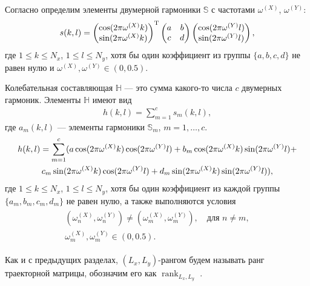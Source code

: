 \documentclass[specialist,
               substylefile = spbu.rtx,
               subf,href,colorlinks=true, 12pt]{disser}
\def\rank{\mathop{\mathrm{rank}}}
\begin{document}
Согласно \cite{Golyandina.Usevich2010} определим элементы двумерной гармоники $\mathbb{S}$ с частотами $\omega^{(X)}$, $\omega^{(Y)}$:
\begin{gather} \label{eq:2d_cos_el}
\notag
s(k,l) =  \left(
\begin{matrix}
\cos(2\pi \omega^{(X)}k) \\ \notag
\sin(2\pi \omega^{(X)}k)
\end{matrix}
\right)^{\mathrm{T}}
 \left(
\begin{matrix}
a & b \\
c & d
\end{matrix}
\right)
 \left(
\begin{matrix}
\cos(2\pi \omega^{(Y)}l) \\ \notag
\sin(2\pi \omega^{(Y)}l)
\end{matrix}
\right),
\notag
\end{gather}
где $1 \leqslant k \leqslant N_x$, $1 \leqslant l \leqslant N_y$, хотя бы один коэффициент из  группы $\{a,b,c,d\}$ не равен нулю и
$\omega^{(X)}, \omega^{(Y)} \in (0,0.5)$.

Колебательная составляющая $\mathbb{H}$ --- это сумма  какого-то числа $c$ двумерных гармоник. Элементы $\mathbb{H}$ имеют вид
\begin{gather} \label{eq:2d_cos}
h(k,l) = \sum_{m=1}^{c}{s_m(k,l)},
\end{gather}
где $a_m(k,l)$ --- элементы гармоники $\mathbb{S}_m$, $m=1,\ldots,c$.
\begin{gather}
\notag
h(k,l) = \sum_{m=1}^{c}(a \cos(2\pi \omega^{(X)}k) \cos(2\pi \omega^{(Y)}l) +
b_m \cos(2\pi \omega^{(X)}k) \sin(2\pi \omega^{(Y)}l) + \\ \label{eq:2d_cos_el_2}
c_m \sin(2\pi \omega^{(X)}k) \cos(2\pi \omega^{(Y)}l) +
d_m \sin(2\pi \omega^{(X)}k) \sin(2\pi \omega^{(Y)}l)),
\end{gather}
где $1 \leqslant k \leqslant N_x$, $1 \leqslant l \leqslant N_y$, хотя бы один коэффициент из каждой группы $\{a_m,b_m,c_m,d_m\}$ не равен нулю, а также выполняются условия
\begin{align} \label{eq:2d_omega}
\begin{matrix}
(\omega_n^{(X)}, \omega_n^{(Y)}) \not = (\omega_m^{(X)}, \omega_m^{(Y)}), \quad \text{для } n \not= m,\\
\omega_m^{(X)}, \omega_m^{(Y)} \in (0,0.5).
\end{matrix}
\end{align}

Как и с предыдущих разделах, $(L_x, L_y)$-рангом будем называть ранг траекторной матрицы, обозначим его как $\rank_{L_x, L_y}$ . 
\end{document}
